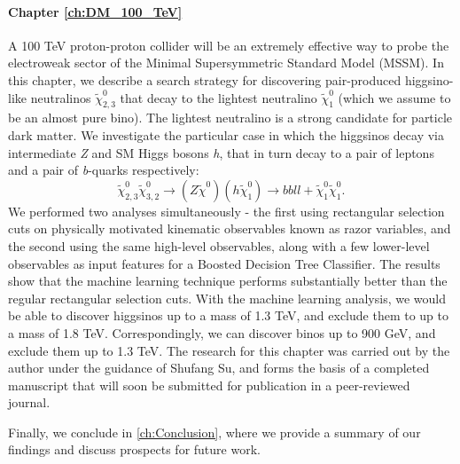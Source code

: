 \paragraph{Chapter \ref{ch:DM_100_TeV}}
A 100 TeV proton-proton collider will be an extremely effective way to probe the electroweak sector of the Minimal Supersymmetric Standard Model (MSSM). In this chapter, we describe a search strategy for discovering pair-produced higgsino-like neutralinos $\tilde{\chi}_{2,3}^0$ that decay to the lightest neutralino $\tilde{\chi}_1^0$ (which we assume to be an almost pure bino). The lightest neutralino is a strong candidate for particle dark matter. We investigate the particular case in which the higgsinos decay via intermediate \emph{Z} and SM Higgs bosons \emph{h}, that in turn decay to a pair of leptons and a pair of \emph{b}-quarks respectively: 
$$\tilde{\chi}^0_{2,3}\tilde{\chi}^0_{3,2}\rightarrow (Z\tilde{\chi}^0)(h\tilde{\chi}_1^0)\rightarrow bbll+\tilde{\chi}_1^0\tilde{\chi}_1^0.$$
We performed two analyses simultaneously - the first using rectangular selection cuts on physically motivated kinematic observables known as razor variables, and the second using the same high-level observables, along with a few lower-level observables as input features for a Boosted Decision Tree Classifier. The results show that the machine learning technique performs substantially better than the regular rectangular selection cuts. With the machine learning analysis, we would be able to discover higgsinos up to a mass of 1.3 TeV, and exclude them to up to a mass of 1.8 TeV. Correspondingly, we can discover binos up to 900 GeV, and exclude them up to 1.3 TeV. The research for this chapter was carried out by the author under the guidance of Shufang Su, and forms the basis of a completed manuscript that will soon be submitted for publication in a peer-reviewed journal.

Finally, we conclude in \autoref{ch:Conclusion}, where we provide a summary of our findings and discuss prospects for future work.

